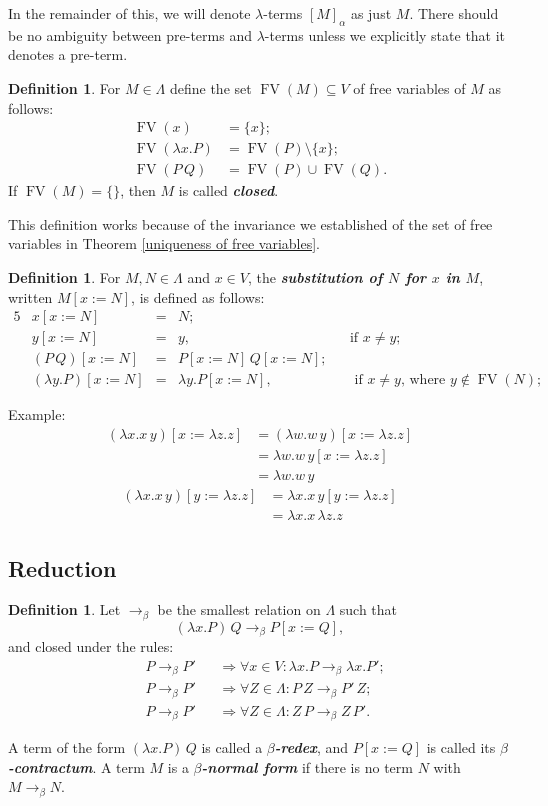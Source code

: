 \documentclass[]{article}
\theoremstyle{definition}
\newtheorem{definition}[theorem]{Definition}
\newcommand{\FV}{\operatorname{FV}}
\newcommand{\deftext}[1]{\textit{\textbf{#1}}}
\newcommand{\betared}{\rightarrow_{\beta}}
\begin{document}
In the remainder of this, we will denote $\lambda$-terms $[M]_{\alpha}$ as just $M$. There should be no ambiguity between pre-terms and $\lambda$-terms unless we explicitly state that it denotes a pre-term.

\begin{definition}
	For $M \in \Lambda$ define the set $\FV(M) \subseteq V$ of free variables of $M$ as follows:
	\begin{align*}
		\FV(x) &= \{x\}; \\
		\FV(\lambda x. P) &= \FV(P)\setminus \{x\}; \\
		\FV(P\, Q) &= \FV(P) \cup \FV(Q).
	\end{align*}
	If $\FV(M) = \{\}$, then $M$ is called \deftext{closed}.
\end{definition}

This definition works because of the invariance we established of the set of free variables in Theorem \ref{uniqueness of free variables}.

\begin{definition}
	For $M, N \in \Lambda$ and $x \in V$, the \deftext{substitution of $N$ for $x$ in $M$}, written $M[x:= N]$, is defined as follows:
	\begin{alignat*}{5}
		&x[x:=N] &= &N; &&\\
		&y[x:=N] &= &y, &&\text{if } x \neq y;\\
		&(P\, Q)[x:=N] &= &P[x:= N]\, Q[x:= N]; &&\\
		&(\lambda y. P)[x:= N] &= &\lambda y. P[x:=N], &&\text{ if } x \neq y \text{, where } y \notin \FV(N); 
	\end{alignat*}	
\end{definition}

Example: 
\begin{align*}
	(\lambda x. x\,y)[x:= \lambda z.z] &= (\lambda w. w\, y)[x:= \lambda z.z] \\
	&= \lambda w.w\, y [x:= \lambda z. z] \\
	&= \lambda w.w\, y  
\end{align*}
\begin{align*}
	(\lambda x. x\,y)[y := \lambda z.z] &= \lambda x. x\, y [y:= \lambda z.z] \\
	&= \lambda x.x \, \lambda z.z 
\end{align*}



\subsection{Reduction}
\begin{definition}
	Let $\betared$ be the smallest relation on $\Lambda$ such that $$(\lambda x. P)\, Q \betared P[x:= Q],$$
	and closed under the rules:
	\begin{align*}
		&P \betared P' && \Rightarrow \forall x \in V: \lambda x.P \betared \lambda x.P'; \\
		&P \betared P' &&\Rightarrow \forall Z \in \Lambda : P\, Z \betared P'\, Z; \\
		&P \betared P' &&\Rightarrow \forall Z \in \Lambda : Z\, P \betared Z \, P'.
	\end{align*}
\end{definition}

A term of the form $(\lambda x. P)\, Q$ is called a \deftext{$\beta$-redex}, and $P[x := Q]$ is called its \deftext{$\beta$-contractum}. A term $M$ is a \deftext{$\beta$-normal form} if there is no term $N$ with $M \betared N$. 
\end{document}
